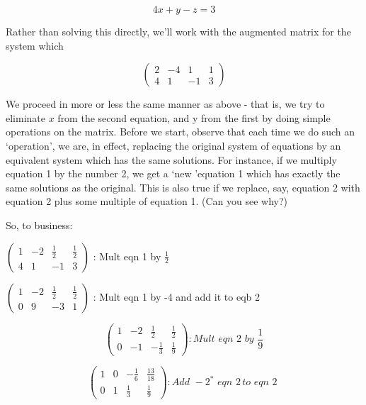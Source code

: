 \documentclass{book}
\begin{document}
\begin{equation} \label{eq}
4x + y − z = 3 \nonumber
\end{equation}

Rather than solving this directly, we\rq ll work with the augmented matrix for the system which

$$ \begin{pmatrix} 2 & -4 & 1 & 1 \\ 4 & 1 & -1 & 3 \end{pmatrix} $$

We proceed in more or less the same manner as above - that is, we try to eliminate $x$ from the second equation, and y from the first by doing simple operations on the matrix. Before we start, observe that each time we do such an \lq operation\rq , we are, in effect, replacing the original system of equations by an equivalent system which has the same solutions. For instance, if we multiply equation 1 by the number 2, we get a \lq new \rq equation 1 which has exactly the same solutions as the original. This is also true if we replace, say, equation 2 with equation 2 plus some multiple of equation 1. (Can you see why?) 

So, to business:

\hspace{2cm} $\begin{pmatrix} 1 & -2 & \frac{1}{2} & \frac{1}{2}\\ 4 & 1 & -1 & 3  \end{pmatrix}$ : Mult eqn 1 by $\frac{1}{2}$

	\hspace{2cm}    $\begin{pmatrix} 1 & -2 & \frac{1}{2} & \frac{1}{2}\\ 0 & 9 & -3 & 1 \end{pmatrix}$ : Mult eqn 1 by -4 and add it to eqb 2

\begin{equation} \label{eq} \begin{pmatrix} 1 & -2 & \frac{1}{2} & \frac{1}{2} \\ 0 & -1 & -\frac{1}{3} & \frac{1}{9}\end{pmatrix}: Mult \,\, eqn\,\, 2\,\, by\,\, \frac{1}{9} \end{equation} 

\begin{equation}\label{eq}\begin{pmatrix} 1 & 0 & -\frac{1}{6} & \frac{13}{18} \\ 0 & 1 & \frac{1}{3} & \frac{1}{9}\end{pmatrix} : Add \,\,-2^*\,\,  eqn\,\, 2\, to\,\, eqn\,\, 2\,\, \end{equation}
\end{document}
